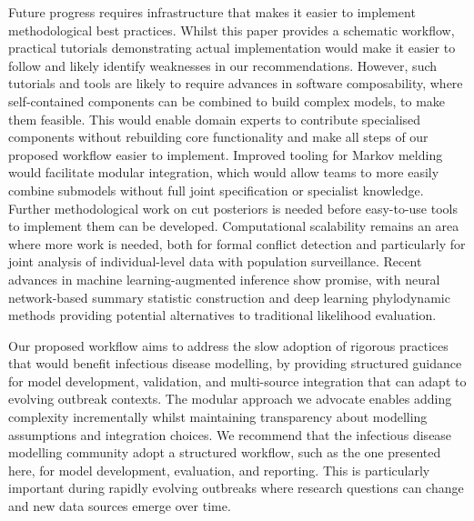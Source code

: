 \documentclass{article}
\begin{document}
Future progress requires infrastructure that makes it easier to implement methodological best practices.
Whilst this paper provides a schematic workflow, practical tutorials demonstrating actual implementation would make it easier to follow and likely identify weaknesses in our recommendations.
However, such tutorials and tools are likely to require advances in software composability, where self-contained components can be combined to build complex models, to make them feasible.
This would enable domain experts to contribute specialised components without rebuilding core functionality and make all steps of our proposed workflow easier to implement.
Improved tooling for Markov melding \citep{goudie2019joining} would facilitate modular integration, which would allow teams to more easily combine submodels without full joint specification or specialist knowledge. Further methodological work on cut posteriors \citep{liu2025general} is needed before easy-to-use tools to implement them can be developed.
Computational scalability remains an area where more work is needed, both for formal conflict detection \citep{yang2025detecting} and particularly for joint analysis of individual-level data with population surveillance.
Recent advances in machine learning-augmented inference show promise, with neural network-based summary statistic construction \citep{raynal2019abc} and deep learning phylodynamic methods \citep{voznica2022deep} providing potential alternatives to traditional likelihood evaluation.


Our proposed workflow aims to address the slow adoption of rigorous practices that would benefit infectious disease modelling, by providing structured guidance for model development, validation, and multi-source integration that can adapt to evolving outbreak contexts.
The modular approach we advocate enables adding complexity incrementally whilst maintaining transparency about modelling assumptions and integration choices.
We recommend that the infectious disease modelling community adopt a structured workflow, such as the one presented here, for model development, evaluation, and reporting. 
This is particularly important during rapidly evolving outbreaks where research questions can change and new data sources emerge over time.
\end{document}
